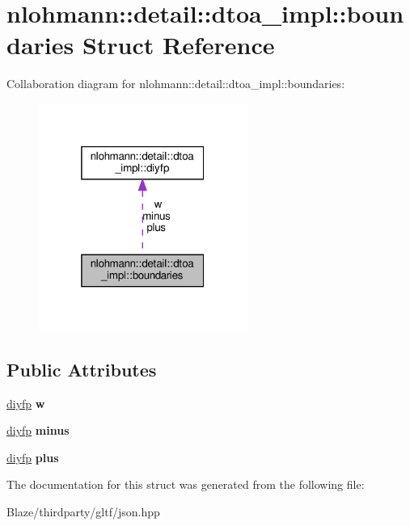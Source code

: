 \hypertarget{structnlohmann_1_1detail_1_1dtoa__impl_1_1boundaries}{}\section{nlohmann\+:\+:detail\+:\+:dtoa\+\_\+impl\+:\+:boundaries Struct Reference}
\label{structnlohmann_1_1detail_1_1dtoa__impl_1_1boundaries}


Collaboration diagram for nlohmann\+:\+:detail\+:\+:dtoa\+\_\+impl\+:\+:boundaries\+:\nopagebreak
\begin{figure}[H]
\begin{center}
\leavevmode
\includegraphics[width=193pt]{structnlohmann_1_1detail_1_1dtoa__impl_1_1boundaries__coll__graph}
\end{center}
\end{figure}
\subsection*{Public Attributes}
\begin{DoxyCompactItemize}
\item 
\mbox{\label{structnlohmann_1_1detail_1_1dtoa__impl_1_1boundaries_ad1668c60aeade5f2557fafed8b8aee1a}} 
\hyperlink{structnlohmann_1_1detail_1_1dtoa__impl_1_1diyfp}{diyfp} {\bfseries w}
\item 
\mbox{\label{structnlohmann_1_1detail_1_1dtoa__impl_1_1boundaries_aec4e5028333c01f3229062f31ce16763}} 
\hyperlink{structnlohmann_1_1detail_1_1dtoa__impl_1_1diyfp}{diyfp} {\bfseries minus}
\item 
\mbox{\label{structnlohmann_1_1detail_1_1dtoa__impl_1_1boundaries_a3321ae2816a6ec5250a0d8e29f798232}} 
\hyperlink{structnlohmann_1_1detail_1_1dtoa__impl_1_1diyfp}{diyfp} {\bfseries plus}
\end{DoxyCompactItemize}


The documentation for this struct was generated from the following file\+:\begin{DoxyCompactItemize}
\item 
Blaze/thirdparty/gltf/json.\+hpp\end{DoxyCompactItemize}
